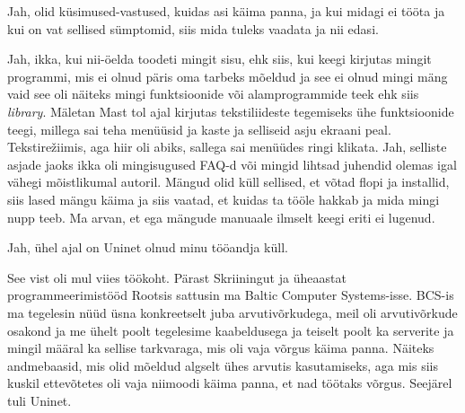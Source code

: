 
Jah,   olid küsimused-vastused, kuidas asi käima panna, ja kui midagi ei tööta 
ja kui on vat sellised sümptomid, siis mida tuleks vaadata ja nii edasi.


Jah, ikka, kui nii-öelda toodeti mingit sisu, ehk siis, kui keegi kirjutas mingit 
programmi, mis ei olnud  päris oma tarbeks mõeldud ja see ei olnud mingi mäng 
vaid see oli näiteks mingi funktsioonide või alamprogrammide teek ehk siis 
\emph{library}. Mäletan Mast tol ajal kirjutas 
tekstiliideste tegemiseks ühe funktsioonide teegi, millega sai teha menüüsid ja 
kaste ja selliseid asju ekraani peal. Tekstirežiimis, aga hiir oli  abiks, 
sallega sai menüüdes ringi klikata. Jah, selliste asjade jaoks ikka oli 
mingisugused FAQ-d või mingid lihtsad juhendid olemas igal vähegi mõistlikumal 
autoril. Mängud olid küll sellised, et võtad flopi ja installid, siis 
lased mängu käima ja siis vaatad, et kuidas ta tööle hakkab ja mida mingi nupp 
teeb. Ma arvan, et ega mängude manuaale ilmselt keegi eriti ei lugenud.


Jah, ühel ajal on Uninet  olnud minu tööandja küll.


See vist oli mul viies töökoht. Pärast Skriiningut ja üheaastat programmeerimistööd Rootsis sattusin ma Baltic 
Computer Systems-isse.
BCS-is ma tegelesin  nüüd üsna konkreetselt juba arvutivõrkudega, 
meil oli arvutivõrkude osakond ja me  ühelt poolt tegelesime 
kaabeldusega ja teiselt poolt  ka serverite ja mingil määral ka sellise 
tarkvaraga, mis  oli vaja võrgus käima panna. Näiteks andmebaasid, mis olid 
mõeldud algselt ühes arvutis kasutamiseks, aga mis siis kuskil ettevõtetes oli 
vaja niimoodi käima panna, et nad töötaks võrgus. Seejärel tuli Uninet.


